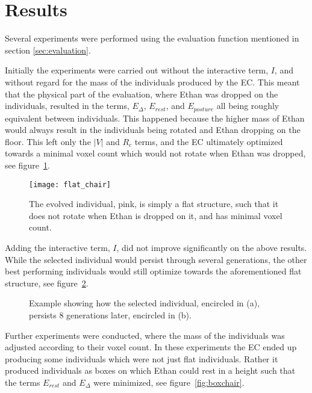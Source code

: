 \section{Results} Several experiments were performed using the evaluation
function mentioned in section \ref{sec:evaluation}. 

Initially the experiments were carried out without the interactive term, $I$,
and without regard for the mass of the individuals produced by the EC. This
meant that the physical part of the evaluation, where Ethan was dropped on the
individuals, resulted in the terms, $E_\Delta$, $E_{rest}$, and $E_{posture}$
all being roughly equivalent between individuals. This happened because the 
higher mass of Ethan would always result in the individuals being rotated and 
Ethan dropping on the floor. This left only the $|V|$ and $R_c$ terms, and the 
EC ultimately optimized towards a minimal voxel count which would not rotate 
when Ethan was dropped, see figure~\ref{fig:flat_object}.

\begin{figure}[ht]
\centering
\texttt{[image: flat\_chair]}
\caption{The evolved individual, pink, is simply a flat structure, such that
it does not rotate when Ethan is dropped on it, and has minimal voxel
count.} \label{fig:flat_object} \end{figure}

Adding the interactive term, $I$, did not improve significantly on the above
results. While the selected individual would persist through several
generations, the other best performing individuals would still optimize towards
the aforementioned flat structure, see figure~\ref{fig:selection}.
\begin{figure}[ht]
	\centering
	 \hfil
	\caption{Example showing how the selected individual, encircled in (a),
	persists 8 generations later, encircled in (b).} \label{fig:selection}
\end{figure}

Further experiments were conducted, where the mass of the individuals was
adjusted according to their voxel count. In these experiments the EC ended up
producing some individuals which were not just flat individuals. Rather it produced
individuals as boxes on which Ethan could rest in a height such that the terms
$E_{rest}$ and $E_\Delta$ were minimized, see figure~\ref{fig:boxchair}.

